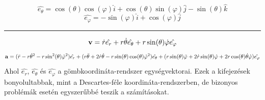 \documentclass[a4paper,12pt]{article}
\begin{document}
\begin{equation}
     \hat{e_\theta} = \cos(\theta)\cos(\varphi)\hat{i} + \cos(\theta)\sin(\varphi)\hat{j} - \sin(\theta)\hat{k}
\end{equation}
\begin{equation}
    \hat{e_\varphi} = -\sin(\varphi)\hat{i} + \cos(\varphi)\hat{j}
\end{equation}
\noindent\hfil\rule{0.5\textwidth}{.4pt}\hfil
\begin{equation}
    \bold{v} = \dot{r}\hat{e_r} + r\dot{\theta}\hat{e_\theta} + r\sin(\theta)\dot{\varphi}\hat{e_\varphi}
\end{equation}
\begin{equation}
    \bold{a} = (\ddot{r} - r\dot{\theta}^2 - r\sin^2(\theta)\dot{\varphi}^2)\hat{e_r} + (r\ddot{\theta} + 2\dot{r}\dot{\theta} - r\sin(\theta)\cos(\theta)\dot{\varphi}^2)\hat{e_\theta} + (r\sin(\theta)\ddot{\varphi} + 2\dot{r}\sin(\theta)\dot{\varphi} + 2r\cos(\theta)\dot{\theta}\dot{\varphi})\hat{e_\varphi}
\end{equation}
Ahol $\hat{e_r}$, $\hat{e_\theta}$ és $\hat{e_\varphi}$ a gömbkoordináta-rendszer egységvektorai. Ezek a kifejezések bonyolultabbak, mint a Descartes-féle koordináta-rendszerben, de bizonyos problémák esetén egyszerűbbé teszik a számításokat.
\end{document}
